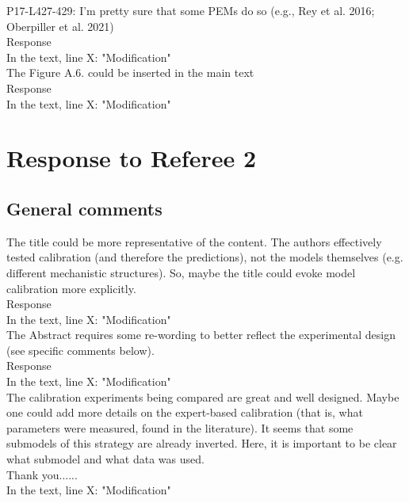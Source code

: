 \documentclass[a4paper, 11pt]{article}
\begin{document}
\noindent P17-L427-429: I'm pretty sure that some PEMs do so (e.g., Rey et al. 2016; Oberpiller et al. 2021)\\
\textcolor{customblue}{Response}\\
In the text, line X: \textcolor{customred}{"Modification"}\\ 

\noindent The Figure A.6. could be inserted in the main text\\
\textcolor{customblue}{Response}\\
In the text, line X: \textcolor{customred}{"Modification"}

\clearpage

\section{Response to Referee 2}

\subsection{General comments}

The title could be more representative of the content. The authors effectively tested calibration (and therefore the predictions), not the models themselves (e.g. different mechanistic structures). So, maybe the title could evoke model calibration more explicitly.\\
\textcolor{customblue}{Response}\\
In the text, line X: \textcolor{customred}{"Modification"}\\ 

\noindent The Abstract requires some re-wording to better reflect the experimental design (see specific comments below).\\
\textcolor{customblue}{Response}\\
In the text, line X: \textcolor{customred}{"Modification"}\\ 

\noindent The calibration experiments being compared are great and well designed. Maybe one could add more details on the expert-based calibration (that is, what parameters were measured, found in the literature). It seems that some submodels of this strategy are already inverted. Here, it is important to be clear what submodel and what data was used.\\
\textcolor{customblue}{Thank you......}\\
In the text, line X: \textcolor{customred}{"Modification"}\\ 
\end{document}
